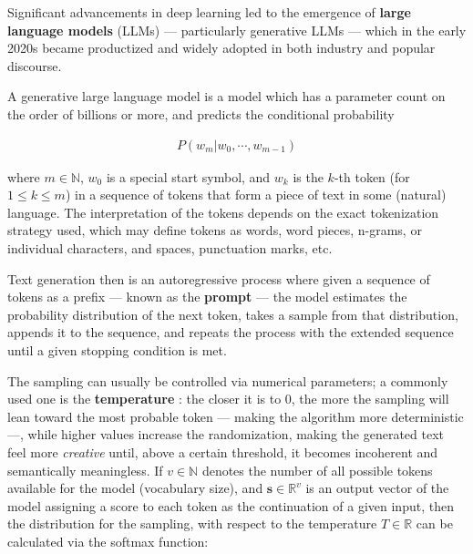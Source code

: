 \documentclass[noindent,nohyp,parspace,titlepage,twoside,12pt]{article}
\begin{document}
      Significant advancements in deep learning \cite{attention,gpt3,gpt4} led
      to the emergence of \textbf{large language models} (LLMs) --- particularly
      generative LLMs --- which in the early 2020s became productized and
      widely adopted in both industry and popular discourse.

      A generative large language model is a model which has a parameter count
      on the order of billions or more, and predicts the conditional
      probability \cite{llms}

      \begin{align} \label{eqautoreg}
        P(w_m | w_0, \cdots, w_{m-1})
      \end{align}

      where $m \in \mathbb{N}$, $w_0$ is a special start symbol, and $w_k$ is
      the $k$-th token (for $1 \le k \le m$) in a sequence of tokens that form
      a piece of text in some (natural) language. The interpretation of the
      tokens depends on the exact tokenization strategy used, which may define
      tokens as words, word pieces, n-grams, or individual characters, and
      spaces, punctuation marks, etc.

      Text generation then is an autoregressive process where given a
      sequence of tokens as a prefix --- known as the \textbf{prompt} --- the
      model estimates the probability distribution of the next token, takes a
      sample from that distribution, appends it to the sequence, and repeats
      the process with the extended sequence until a given stopping condition
      is met.

      The sampling can usually be controlled via numerical parameters; a
      commonly used one is the \textbf{temperature} \cite{temperature}: the
      closer it is to 0, the more the sampling will lean toward the most
      probable token --- making the algorithm more deterministic ---, while
      higher values increase the randomization, making the generated text feel
      more \emph{creative} until, above a certain threshold, it becomes
      incoherent and semantically meaningless. If $v \in \mathbb{N}$ denotes
      the number of all possible tokens available for the model (vocabulary
      size), and $\mathbf{s} \in \mathbb{R}^v$ is an output vector of the model
      assigning a score to each token as the continuation of a given input,
      then the distribution for the sampling, with respect to the temperature
      $T \in \mathbb{R}$ can be calculated via the softmax function:
\end{document}
